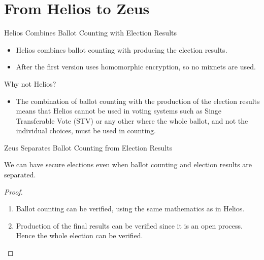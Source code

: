 \documentclass[utf8]{beamer}
\begin{document}
\section{From Helios to Zeus}

\begin{frame}{Helios Combines Ballot Counting with Election Results}

  \begin{itemize}
  \item Helios combines ballot counting with producing the election
    results.
  \item After the first version uses homomorphic encryption, so no
    mixnets are used.
  \end{itemize}

\end{frame}

\begin{frame}{Why not Helios?}

  \begin{itemize}
  \item The combination of ballot counting with the production of the
    election results means that Helios cannot be used in voting
    systems such as Singe Transferable Vote (STV) or any other where
    the whole ballot, and not the individual choices, must be used in
    counting.
  \end{itemize}
  
\end{frame}

\begin{frame}{Zeus Separates Ballot Counting from Election Results}
  
  \begin{theorem}
    We can have secure elections even when ballot counting and election
    results are separated.
  \end{theorem}

\begin{proof}
  \begin{enumerate}
  \item<1-> Ballot counting can be verified, using the same mathematics
    as in Helios.
  \item<2-> Production of the final results can be verified since it is
    an open process. Hence the whole election can be verified.\qedhere
  \end{enumerate}
\end{proof}

\end{frame}
\end{document}
